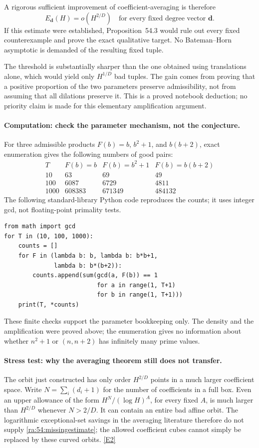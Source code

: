 \documentclass[11pt]{article}
\newcommand{\eref}[2]{\hyperlink{extra:#1:#2}{[E#2]}}
\begin{document}
A rigorous sufficient improvement of coefficient-averaging is therefore
\begin{equation}\label{ra:54:missingestimate}
 \boxed{\quad E_{\mathbf d}(H)=o(H^{2/D})
 \quad\text{for every fixed degree vector }\mathbf d.\quad}
\end{equation}
If this estimate were established, Proposition~54.3 would rule out every
fixed counterexample and prove the exact qualitative target. No
Bateman--Horn asymptotic is demanded of the resulting fixed tuple.

The threshold is substantially sharper than the one obtained using
translations alone, which would yield only $H^{1/D}$ bad tuples.
The gain comes from proving that a positive proportion of the two
parameters preserve admissibility, not from assuming that all dilations
preserve it. This is a proved notebook deduction; no priority claim is
made for this elementary amplification argument.

\paragraph{Computation: check the parameter mechanism, not the conjecture.}
For three admissible products $F(b)=b$, $b^2+1$, and $b(b+2)$,
exact enumeration gives the following numbers of good pairs:
\[
\begin{array}{c|rrr}
 T & F(b)=b & F(b)=b^2+1 & F(b)=b(b+2)\\\hline
 10&63&69&49\\
 100&6087&6729&4811\\
 1000&608383&671349&484132
\end{array}
\]
The following standard-library Python code reproduces the counts; it
uses integer gcd, not floating-point primality tests.
\begin{verbatim}
from math import gcd
for T in (10, 100, 1000):
    counts = []
    for F in (lambda b: b, lambda b: b*b+1,
              lambda b: b*(b+2)):
        counts.append(sum(gcd(a, F(b)) == 1
                          for a in range(1, T+1)
                          for b in range(1, T+1)))
    print(T, *counts)
\end{verbatim}
These finite checks support the parameter bookkeeping only. The density
and the amplification were proved above; the enumeration gives no
information about whether $n^2+1$ or $(n,n+2)$ has infinitely many prime
values.

\paragraph{Stress test: why the averaging theorem still does not transfer.}
The orbit just constructed has only order $H^{2/D}$ points in a much
larger coefficient space. Write $N=\sum_i(d_i+1)$ for the number of
coefficients in a full box. Even an upper allowance of the form
$H^N/(\log H)^A$, for every fixed $A$, is much larger than
$H^{2/D}$ whenever $N>2/D$. It can contain an entire bad affine orbit.
The logarithmic exceptional-set savings in the averaging literature
therefore do not supply \eqref{ra:54:missingestimate}; the allowed
coefficient cubes cannot simply be replaced by these curved orbits.
\eref{54}{2}
\end{document}
